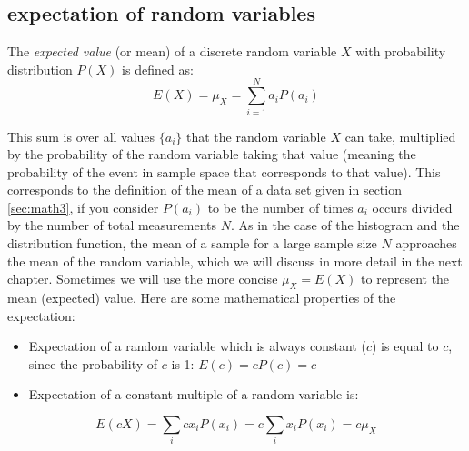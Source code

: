 \documentclass[
  letterpaper,
  DIV=11,
  numbers=noendperiod]{scrreprt}
\providecommand{\tightlist}{%
  \setlength{\itemsep}{0pt}\setlength{\parskip}{0pt}}\usepackage{longtable,booktabs,array}
\begin{document}
\hypertarget{expectation-of-random-variables}{%
\subsection{expectation of random
variables}\label{expectation-of-random-variables}}

\begin{tcolorbox}[enhanced jigsaw, coltitle=black, arc=.35mm, opacitybacktitle=0.6, breakable, bottomtitle=1mm, toptitle=1mm, titlerule=0mm, colback=white, leftrule=.75mm, rightrule=.15mm, colframe=quarto-callout-note-color-frame, colbacktitle=quarto-callout-note-color!10!white, opacityback=0, title=\textcolor{quarto-callout-note-color}{\faInfo}\hspace{0.5em}{Definition}, left=2mm, toprule=.15mm, bottomrule=.15mm]

The \emph{expected value} (or mean) of a discrete random variable \(X\)
with probability distribution \(P(X)\) is defined as:
\[ E(X) = \mu_X = \sum_{i=1}^N  a_i P(a_i)\]

\end{tcolorbox}

This sum is over all values \(\{a_i\}\) that the random variable \(X\)
can take, multiplied by the probability of the random variable taking
that value (meaning the probability of the event in sample space that
corresponds to that value). This corresponds to the definition of the
mean of a data set given in section \ref{sec:math3}, if you consider
\(P(a_i)\) to be the number of times \(a_i\) occurs divided by the
number of total measurements \(N\). As in the case of the histogram and
the distribution function, the mean of a sample for a large sample size
\(N\) approaches the mean of the random variable, which we will discuss
in more detail in the next chapter. Sometimes we will use the more
concise \(\mu_X = E(X)\) to represent the mean (expected) value. Here
are some mathematical properties of the expectation:

\begin{itemize}
\tightlist
\item
  Expectation of a random variable which is always constant (\(c\)) is
  equal to \(c\), since the probability of \(c\) is 1:
  \(E(c) = cP(c) = c\)
\item
  Expectation of a constant multiple of a random variable is:
\end{itemize}

\[E(cX) = \sum_i c x_iP(x_i) = c \sum_i x_iP(x_i) = c \mu_X\]
\end{document}
